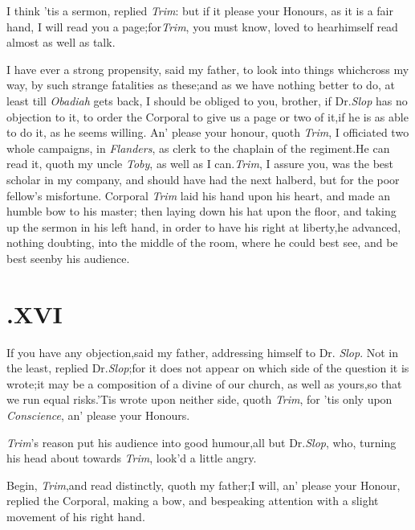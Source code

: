 \documentclass{article}
\begin{document}
I think ’tis a sermon, replied \textit{Trim}:\tsk\break
but if it please your Honours, as it is a fair hand, I will read you a
page;\tsk for\break \textit{Trim}, you must know, loved to
hear\break himself
read almost as well as talk.

I have ever a strong propensity, said my father, to look into
things which\break cross my way, by such strange fatalities\break
as these;\tsk and as we have nothing better to do, at least
till \textit{Obadiah} gets back,
I should be obliged to you, brother, if Dr.\@ \textit{Slop} has no
objection to it, to order the Corporal to give us a page or two of
it,\tsk if he is as able to do it, as he seems willing. An’
please your honour, quoth \textit{Trim}, I officiated two whole
campaigns, in \textit{Flanders}, as clerk to the chaplain of the
regiment.\tsh He can read it, quoth my uncle \textit{Toby},
as well as I can.\tsh \textit{Trim}, I assure you, was the
best scholar in my company, and should have had the next halberd,
but for the poor fellow’s mis\-fortune. Corporal \textit{Trim}
laid his hand upon his heart, and made an humble bow to his
master;\tsk
then laying down his hat upon the floor, and taking up the sermon
in his left hand, in order to have his right at liberty,\tsk he
advanced, nothing doubting, into the middle of the room, where he
could best see, and be best seen\break by his audience.\\
\newpage
\section{.\enspace  XVI}

\quad\tsh If you have any
objection,\tsk said my father, addressing himself to Dr.\@
\textit{Slop}.\break
Not in the least, replied Dr.\@ \textit{Slop};\tsk for
it does not appear on which side of the question it is
wrote;\tsk it may be a composition of a divine of our church, as
well as yours,\tsk so that we run equal
risks.\tsh ’Tis wrote upon neither side, quoth
\textit{Trim}, for ’tis only upon \textit{Conscience},\break
an’ please your Honours.

\textit{Trim}’s reason put his audience into good
humour,\tsk all but Dr.\@ \textit{Slop}, who,
turning his head about towards \textit{Trim},\break
look’d a little angry.

Begin, \textit{Trim},\tsh and read distinctly, quoth my
father;\tsk I will, an’ please your
Honour, replied the
Corporal, making a bow, and bespeaking attention with a slight
movement of his right hand.
\end{document}
